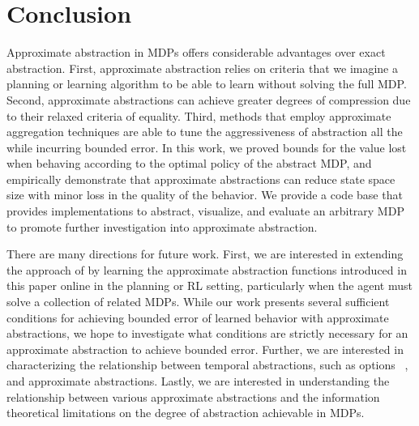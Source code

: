 \section{Conclusion}

Approximate abstraction in \acp{MDP} offers considerable advantages over exact abstraction. First, approximate abstraction relies on criteria that we imagine a planning or learning algorithm to be able to learn without solving the full \ac{MDP}. Second, approximate abstractions can achieve greater degrees of compression due to their relaxed criteria of equality. Third, methods that employ approximate aggregation techniques are able to tune the aggressiveness of abstraction all the while incurring bounded error. In this work, we proved bounds for the value lost when behaving according to the optimal policy of the abstract \ac{MDP}, and empirically demonstrate that approximate abstractions can reduce state space size with minor loss in the quality of the behavior. We provide a code base that provides implementations to abstract, visualize, and evaluate an arbitrary MDP to promote further investigation into approximate abstraction.





There are many directions for future work.
First, we are interested in extending the approach of \citet{ortner2013adaptive} by learning the approximate abstraction functions introduced in this paper online in the planning or \ac{RL} setting, particularly when the agent must solve a collection of related MDPs.
While our work presents several sufficient conditions for achieving bounded error of learned behavior with approximate abstractions, we hope to investigate what conditions are strictly necessary for an approximate abstraction to achieve bounded error.
Further, we are interested in characterizing the relationship between temporal abstractions, such as options ~\cite{sutton1999between}, and approximate abstractions.
Lastly, we are interested in understanding the relationship between various approximate abstractions and the information theoretical limitations on the degree of abstraction achievable in \acp{MDP}.

